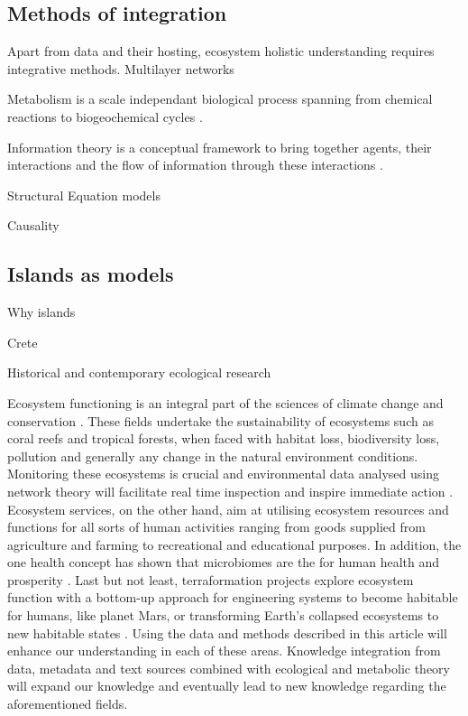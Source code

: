 \subsection{Methods of integration}
\label{sec:meth-int}

Apart from data and their hosting, ecosystem holistic understanding requires
integrative methods.
Multilayer networks \citep{marine-multilayers}

Metabolism is a scale independant biological process spanning from chemical reactions
to biogeochemical cycles \citep{hall2018understanding}. 

Information theory is a conceptual framework to bring together agents,
their interactions and the flow of information through these interactions \citep{oconnor-information-ecology}.

Structural Equation models

Causality

\subsection{Islands as models}
\label{sec:island-model}

Why islands

Crete 

Historical and contemporary ecological research

Ecosystem functioning is an integral part of the sciences of climate change
and conservation \citep{cavicchioli2019scientists}. These fields undertake the
sustainability of ecosystems such as coral reefs and tropical forests, when
faced with habitat loss, biodiversity loss, pollution and generally any change
in the natural environment conditions. Monitoring these ecosystems is crucial
and environmental data analysed using network theory will facilitate real time
inspection and inspire immediate action \citep{derocles2018Biomonitoring}.
Ecosystem services, on the other hand, aim at utilising ecosystem resources
and functions for all sorts of human activities ranging from goods supplied
from agriculture and farming \citep{alvarez-silva2017Compartmentalized} to
recreational and educational purposes. In addition, the one health concept has
shown that microbiomes are the for human health and prosperity
\citep{banerjee2023Soil}. Last but not least, terraformation
projects explore ecosystem function with a bottom-up approach for engineering
systems to become habitable for humans, like planet Mars, or transforming
Earth's collapsed ecosystems to new habitable states
\citep{conde-pueyo2020Synthetic}. Using the data and methods described in this
article will enhance our understanding in each of these areas. Knowledge
integration from data, metadata and text sources combined with ecological and
metabolic theory will expand our knowledge and eventually lead to new
knowledge regarding the aforementioned fields.


